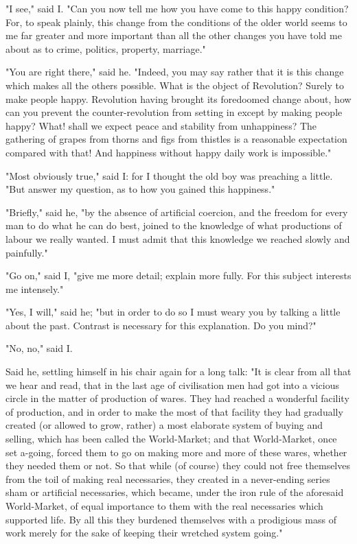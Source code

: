 "I see," said I. "Can you now tell me how you have come to this happy
condition? For, to speak plainly, this change from the conditions of the
older world seems to me far greater and more important than all the
other changes you have told me about as to crime, politics, property,
marriage."

"You are right there," said he. "Indeed, you may say rather that it is
this change which makes all the others possible. What is the object of
Revolution? Surely to make people happy. Revolution having brought its
foredoomed change about, how can you prevent the counter-revolution from
setting in except by making people happy? What! shall we expect peace
and stability from unhappiness? The gathering of grapes from thorns and
figs from thistles is a reasonable expectation compared with that! And
happiness without happy daily work is impossible."

"Most obviously true," said I: for I thought the old boy was preaching a
little. "But answer my question, as to how you gained this happiness."

"Briefly," said he, "by the absence of artificial coercion, and the
freedom for every man to do what he can do best, joined to the knowledge
of what productions of labour we really wanted. I must admit that this
knowledge we reached slowly and painfully."

"Go on," said I, "give me more detail; explain more fully. For this
subject interests me intensely."

"Yes, I will," said he; "but in order to do so I must weary you by
talking a little about the past. Contrast is necessary for this
explanation. Do you mind?"

"No, no," said I.

Said he, settling himself in his chair again for a long talk: "It is
clear from all that we hear and read, that in the last age of
civilisation men had got into a vicious circle in the matter of
production of wares. They had reached a wonderful facility of
production, and in order to make the most of that facility they had
gradually created (or allowed to grow, rather) a most elaborate system
of buying and selling, which has been called the World-Market; and that
World-Market, once set a-going, forced them to go on making more and
more of these wares, whether they needed them or not. So that while (of
course) they could not free themselves from the toil of making real
necessaries, they created in a never-ending series sham or artificial
necessaries, which became, under the iron rule of the aforesaid
World-Market, of equal importance to them with the real necessaries
which supported life. By all this they burdened themselves with a
prodigious mass of work merely for the sake of keeping their wretched
system going."

